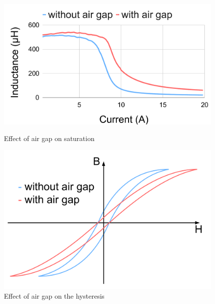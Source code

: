 \begin{figure}[H]
    \centering
    \begin{minipage}{0.5\textwidth}
        \centering
        \includegraphics[width=1\linewidth]{Bilder/Kapitel2/Saturation_air_gap.pdf}
        \caption{Effect of air gap on saturation}
        \label{fig:saturation_air_gap}
    \end{minipage}\hfill
    \begin{minipage}{0.5\textwidth}
        \centering
    \includegraphics[width=0.9\linewidth]{Bilder//Kapitel2/Hysteresis_air_gap.pdf}
    \caption{Effect of air gap on the hysteresis}
    \label{fig:hysteresis_air_gap}
    \end{minipage}\hfill
\end{figure}

\newpage
